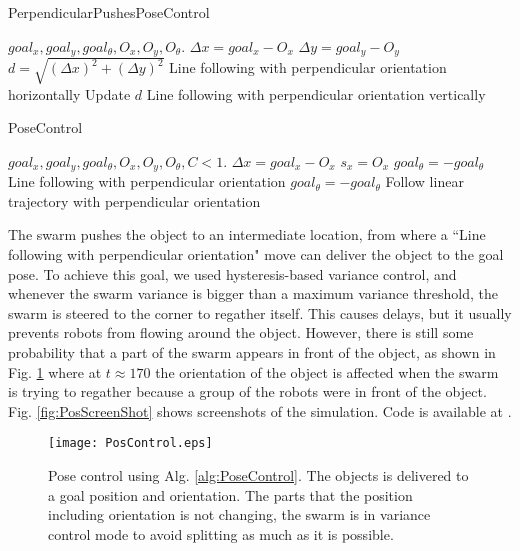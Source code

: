 \begin{algorithm}
\caption{PerpendicularPushesPoseControl}\label{alg:naivePoseControlApproach}
\begin{algorithmic}[1]
\Require $goal_x, goal_y, goal_{\theta},O_x, O_y, O_{\theta}$.
\State $\Delta x = goal_x - O_x$
\State $\Delta y = goal_y - O_y$
\State $d = \sqrt{(\Delta x)^2 + (\Delta y)^2} $ 
\State Line following with perpendicular orientation horizontally
\State Update $d$
\EndWhile
\State Line following with perpendicular orientation vertically
\end{algorithmic}
\end{algorithm}



\begin{algorithm}
\caption{PoseControl}\label{alg:PoseControl}
\begin{algorithmic}[1]
\Require $goal_x, goal_y, goal_{\theta},O_x, O_y, O_{\theta}, C<1$.
\State $\Delta x = goal_x - O_x$
\State $s_x = O_x$ 
\State $goal_{\theta} = -goal_{\theta}$ 
\State Line following with perpendicular orientation
\EndWhile
\State $goal_{\theta} = -goal_{\theta}$
\State Follow linear trajectory with perpendicular orientation
\end{algorithmic}
\end{algorithm}



The swarm pushes the object to an intermediate location, from where a ``Line following with perpendicular orientation" move can deliver the object to the goal pose. 
To achieve this goal, we used hysteresis-based variance control, and whenever the swarm variance is bigger than a maximum variance threshold, the swarm is steered to  the corner to regather itself. 
This causes delays, but it usually prevents robots from flowing around the object. However, there is still some probability that a part of the swarm appears in front of the object, as shown in Fig. \ref{fig:PosControlFig} where at $t\approx170$ the orientation of the object is affected when the swarm is trying to regather because a group of the robots were in front of the object. Fig. \ref{fig:PosScreenShot} shows screenshots of the simulation. Code is available at \cite{Shahrokhi16pose}.

\begin{figure}
\begin{center}
	\texttt{[image: PosControl.eps]}
\end{center}
\vspace{-2em}
\caption{\label{fig:PosControlFig} 
Pose control using Alg. \ref{alg:PoseControl}.  The objects is delivered to a goal position and orientation. The parts that the position including orientation is not changing, the swarm is in variance control mode to avoid splitting as much as it is possible. 
}
\vspace{-1em}
\end{figure}


